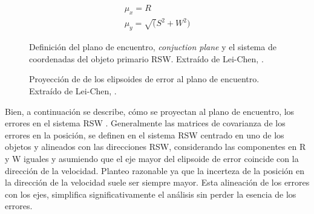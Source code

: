 \begin{gather}
 \mu_{x}=R\\
 \mu_{y}=\sqrt(S^{2}+W^{2})
\end{gather}

\begin{figure}[!h]
\begin{minipage}[t]{0.48\textwidth}
 \centering
 \caption[Plano de encuentro y proyecci\'on del sistema RSW]{Definici\'on del plano de encuentro, {\it{conjuction plane}} y el sistema de coordenadas del objeto primario RSW. Extra\'ido de Lei-Chen, \citep{leichen}.}
 \label{fig:pocplano}
\end{minipage}
\begin{minipage}[t]{0.48\textwidth}
 \centering
 \caption[Proyecci\'on de los elipsoides de error al plano de encuentro]{Proyecci\'on de de los elipsoides de error al plano de encuentro. Extra\'ido de Lei-Chen, \citep{leichen}.}
\label{fig:pochorizontal}
\end{minipage}
\end{figure}

Bien, a continuaci\'on se describe, c\'omo se proyectan al plano de encuentro, los errores en el sistema RSW .
Generalmente las matrices de covarianza de los errores en la posici\'on, se definen en el sistema RSW centrado en uno de los objetos y alineados con las direcciones RSW, considerando las componentes en R y W iguales y asumiendo que el eje mayor del elipsoide de error coincide con la direcci\'on de la velocidad. Planteo razonable ya que la incerteza de la posici\'on en la direcci\'on de la velocidad suele ser siempre mayor. Esta alineaci\'on de los errores con los ejes, simplifica significativamente el an\'alisis sin perder la esencia de los errores. 

